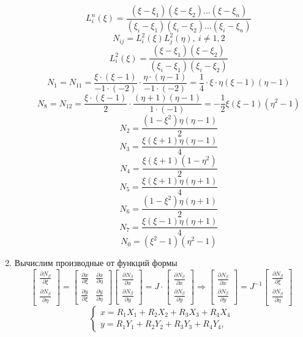 \documentclass[a4paper, 12pt]{article}
\begin{document}
\begin{enumerate}
\begin{enumerate}
				\[
					L_i^n(\xi)=\frac{(\xi-\xi_1)(\xi-\xi_2)\dots(\xi-\xi_n)}{(\xi_i-\xi_1)(\xi_i-\xi_2)\dots(\xi_i-\xi_n)}
				\]
				\[
					N_{ij}=L_i^2(\xi)L_j^2(\eta),\ i \neq 1,2
				\]
				\[
					L_i^2(\xi)=\frac{(\xi-\xi_1)(\xi-\xi_2)}{(\xi_i-\xi_1)(\xi_i-\xi_2)}
				\]
				\[
					N_1 = N_{11}=\frac{\xi\cdot(\xi-1)}{-1\cdot(-2)}\cdot \frac{\eta\cdot(\eta-1)}{-1\cdot(-2)}=\frac{1}{4}\cdot\xi\cdot\eta (\xi-1)(\eta-1)
				\]
				\[
					N_8 = N_{12}=\frac{\xi\cdot(\xi-1)}{2}\cdot \frac{(\eta+1)(\eta-1)}{1\cdot(-1)} = -\frac{1}{2} \xi(\xi - 1)(\eta^2 - 1)
				\]
				\[
					N_2 = \frac{(1 - \xi^2)\eta (\eta - 1)}{2}
				\]
				\[
					N_3 = \frac{\xi (\xi + 1)\eta (\eta - 1)}{4}
				\]
				\[
					N_4 = \frac{\xi (\xi + 1)(1 - \eta^2)}{2}
				\]
				\[
					N_5 = \frac{\xi (\xi + 1)\eta (\eta + 1)}{4}
				\]
				\[
					N_6 = \frac{(1 - \xi^2)\eta (\eta + 1)}{2}
				\]
				\[
					N_7 = \frac{\xi (\xi - 1) \eta (\eta + 1)}{4}
				\]
				\[
					N_0 = (\xi^2 - 1)(\eta^2 - 1)
				\]
			\end{enumerate}
		\newpage
		\item Вычислим производные от функций формы
		\[
			\begin{bmatrix}
				\frac{\partial N_{\beta}}{\partial \xi} \\
				\frac{\partial N_{\beta}}{\partial \eta}
			\end{bmatrix} = \begin{bmatrix}
			\frac{\partial x}{\partial \xi} & \frac{\partial x}{\partial \eta} \\
			\frac{\partial y}{\partial \xi} & \frac{\partial y}{\partial \eta}
			\end{bmatrix} \begin{bmatrix}
			\frac{\partial N_{\beta}}{\partial x} \\
			\frac{\partial N_{\beta}}{\partial y}
			\end{bmatrix} = 
			J \cdot \begin{bmatrix}
				\frac{\partial N_{\beta}}{\partial x} \\
				\frac{\partial N_{\beta}}{\partial y}
				\end{bmatrix}
			\Rightarrow \begin{bmatrix}
			\frac{\partial N_{\beta}}{\partial x} \\
			\frac{\partial N_{\beta}}{\partial y}
			\end{bmatrix}=J^{-1} \begin{bmatrix}
			\frac{\partial N_{\beta}}{\partial \xi} \\
			\frac{\partial N_{\beta}}{\partial \eta}
			\end{bmatrix}
		\]
		\[
			\begin{cases}
				x=R_1X_1+R_2X_2+R_3X_3+R_4X_4 \\
				y=R_1Y_1+R_2Y_2+R_3Y_3+R_4Y_4,
			\end{cases}
		\]


\end{enumerate}
\end{document}
